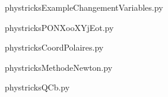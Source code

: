     

    \clearpage
    


    \newcommand{\CaptionFigExampleChangementVariables}{<+Type your caption here+>}
    \begin{center}
        
    \end{center}
    phystricksExampleChangementVariables.py

    

    \clearpage
    


    \newcommand{\CaptionFigPONXooXYjEot}{<+Type your caption here+>}
    \begin{center}
        
    \end{center}
    phystricksPONXooXYjEot.py

    

    \clearpage
    


    \newcommand{\CaptionFigCoordPolaires}{<+Type your caption here+>}
    \begin{center}
        
    \end{center}
    phystricksCoordPolaires.py

    

    \clearpage
    


    \newcommand{\CaptionFigMethodeNewton}{<+Type your caption here+>}
    \begin{center}
        
    \end{center}
    phystricksMethodeNewton.py

    

    \clearpage
    


    \newcommand{\CaptionFigQCb}{<+Type your caption here+>}
    \begin{center}
        
    \end{center}
    phystricksQCb.py

    

    \clearpage
    

